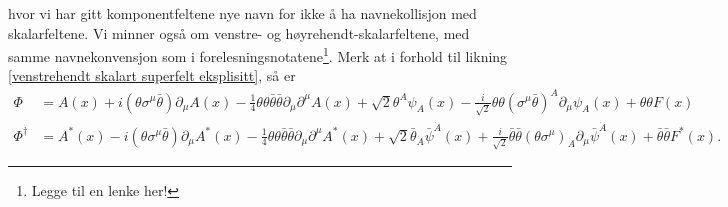 \documentclass[notes.tex]{subfiles}
\begin{document}
\begin{Answer}
\begin{equation}
    \label{vektorsuperfelt2}
\end{equation}
hvor vi har gitt komponentfeltene nye navn for ikke å ha navnekollisjon med skalarfeltene. Vi minner også om venstre- og høyrehendt-skalarfeltene, med samme navnekonvensjon som i forelesningsnotatene\footnote{Legge til en lenke her!}. Merk at i forhold til likning \eqref{venstrehendt skalart superfelt eksplisitt}, så er 
\begin{align}
    \label{venstrehendt skalarfelt2} 
    \Phi & =A(x) + i(\theta\sigma^\mu\bar{\theta})\partial_\mu A(x) - \frac{1}{4}\theta\theta\bar{\theta}\bar{\theta}\partial_\mu\partial^{\mu}A(x) + \sqrt{2}\theta^A\psi_{A}(x) - \frac{i}{\sqrt{2}}\theta\theta (\sigma^\mu\bar\theta)^A\partial_\mu \psi_A (x) + \theta \theta F(x)\\
    \label{høyrehendt skalarfelt2}
    \Phi^\dagger &= A^*(x) - i(\theta \sigma^{\mu}\bar{\theta})\partial_\mu A^*(x) - \frac{1}{4}\theta\theta\bar{\theta}\bar{\theta}\partial_\mu\partial^\mu A^*(x) + \sqrt{2}\bar{\theta}_{\dot{A}}\bar{\psi}^{\dot{A}}(x) + \frac{i}{\sqrt{2}}\bar{\theta} \bar{\theta}(\theta\sigma^{\mu})_{\dot{A}}\partial_\mu\bar{\psi}^{\dot{A}}(x) + \bar{\theta}\bar{\theta}F^*(x).
\end{align}


\end{Answer}
\end{document}
